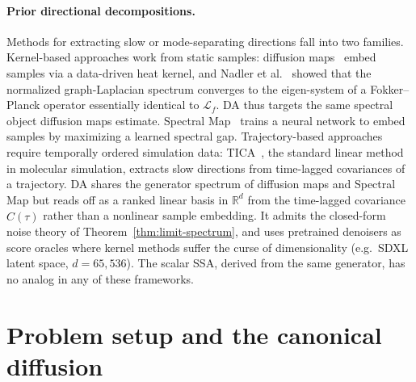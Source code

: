 \documentclass{article}
\newcommand{\R}{\mathbb{R}}
\begin{document}
\paragraph{Prior directional decompositions.}
Methods for extracting slow or mode-separating directions fall into two
families. Kernel-based approaches work from static samples: diffusion maps~\cite{coifman2006} embed samples via a data-driven heat kernel, and Nadler et al.~\cite{nadler2005diffusion} showed that the normalized graph-Laplacian spectrum converges to the eigen-system of a Fokker--Planck operator essentially identical to $\mathcal{L}_f$. DA thus targets the same spectral object diffusion maps estimate. Spectral Map~\cite{rydzewski2023,rydzewski2024} trains a
neural network to embed samples by maximizing a learned
spectral gap. Trajectory-based approaches require temporally ordered
simulation data: TICA~\cite{molgedey1994,perez2013}, the standard linear
method in molecular simulation, extracts slow directions from
time-lagged covariances of a trajectory. DA shares the generator spectrum of diffusion maps and Spectral Map but reads off as a ranked linear basis in $\R^d$ from the time-lagged covariance $\hat C(\tau)$ rather than a nonlinear sample embedding. It admits the closed-form noise theory of Theorem~\ref{thm:limit-spectrum}, and uses pretrained denoisers as score oracles where kernel methods suffer the curse of dimensionality (e.g.\ SDXL latent space, $d = 65{,}536$). The scalar SSA, derived from the same generator, has no analog in any of these frameworks. 





\section{Problem setup and the canonical diffusion}
\label{sec:canonical}
\end{document}

